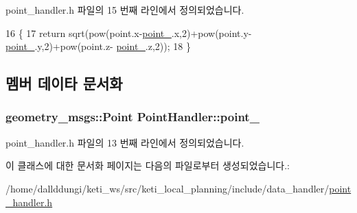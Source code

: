 point\+\_\+handler.\+h 파일의 15 번째 라인에서 정의되었습니다.


\begin{DoxyCode}
16   \{
17     \textcolor{keywordflow}{return} sqrt(pow(point.x-\hyperlink{class_point_handler_ad95d3d370852a0dfb97f099e01934f6a}{point\_}.x,2)+pow(point.y-\hyperlink{class_point_handler_ad95d3d370852a0dfb97f099e01934f6a}{point\_}.y,2)+pow(point.z-
      \hyperlink{class_point_handler_ad95d3d370852a0dfb97f099e01934f6a}{point\_}.z,2));
18   \}
\end{DoxyCode}


\subsection{멤버 데이타 문서화}
\subsubsection[{\texorpdfstring{point\+\_\+}{point_}}]{\setlength{\rightskip}{0pt plus 5cm}geometry\+\_\+msgs\+::\+Point Point\+Handler\+::point\+\_\+\hspace{0.3cm}{\ttfamily [private]}}\hypertarget{class_point_handler_ad95d3d370852a0dfb97f099e01934f6a}{}\label{class_point_handler_ad95d3d370852a0dfb97f099e01934f6a}


point\+\_\+handler.\+h 파일의 13 번째 라인에서 정의되었습니다.



이 클래스에 대한 문서화 페이지는 다음의 파일로부터 생성되었습니다.\+:\begin{DoxyCompactItemize}
\item 
/home/dallddungi/keti\+\_\+ws/src/keti\+\_\+local\+\_\+planning/include/data\+\_\+handler/\hyperlink{point__handler_8h}{point\+\_\+handler.\+h}\end{DoxyCompactItemize}
